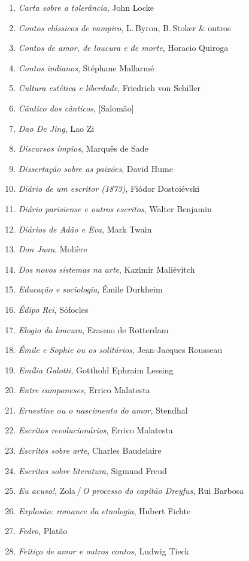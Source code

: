 \begin{enumerate}
\item \textit{Carta sobre a tolerância}, John Locke
\item \textit{Contos clássicos de vampiro}, L.\,Byron, B.\,Stoker \& outros
\item \textit{Contos de amor, de loucura e de morte}, Horacio Quiroga
\item \textit{Contos indianos}, Stéphane Mallarmé
\item \textit{Cultura estética e liberdade}, Friedrich von Schiller
\item \textit{Cântico dos cânticos}, [Salomão]
\item \textit{Dao De Jing}, Lao Zi
\item \textit{Discursos ímpios}, Marquês de Sade
\item \textit{Dissertação sobre as paixões}, David Hume
\item \textit{Diário de um escritor (1873)}, Fiódor Dostoiévski
\item \textit{Diário parisiense e outros escritos}, Walter Benjamin
\item \textit{Diários de Adão e Eva}, Mark Twain
\item \textit{Don Juan}, Molière
\item \textit{Dos novos sistemas na arte}, Kazimir Maliévitch
\item \textit{Educação e sociologia}, Émile Durkheim
\item \textit{Édipo Rei}, Sófocles
\item \textit{Elogio da loucura}, Erasmo de Rotterdam
\item \textit{Émile e Sophie ou os solitários}, Jean-Jacques Rousseau 
\item \textit{Emília Galotti}, Gotthold Ephraim Lessing
\item \textit{Entre camponeses}, Errico Malatesta
\item \textit{Ernestine ou o nascimento do amor}, Stendhal
\item \textit{Escritos revolucionários}, Errico Malatesta
\item \textit{Escritos sobre arte}, Charles Baudelaire
\item \textit{Escritos sobre literatura}, Sigmund Freud
\item \textit{Eu acuso!}, Zola\,/\,\textit{O processo do capitão Dreyfus}, Rui Barbosa
\item \textit{Explosão: romance da etnologia}, Hubert Fichte
\item \textit{Fedro}, Platão
\item \textit{Feitiço de amor e outros contos}, Ludwig Tieck

\end{enumerate}
